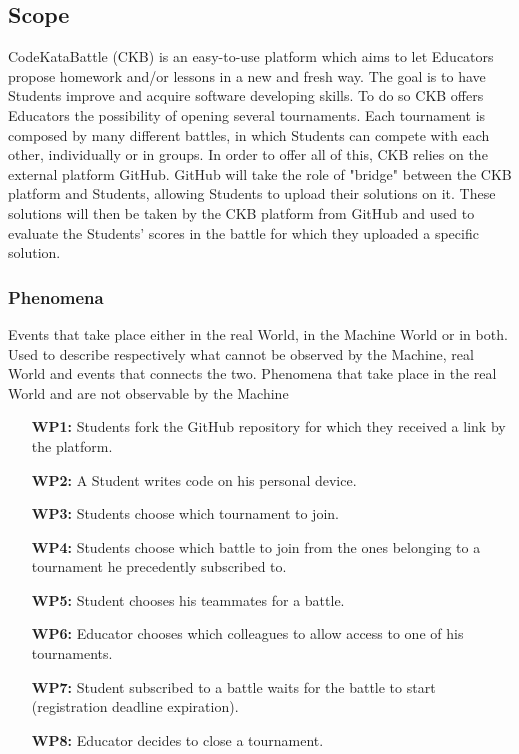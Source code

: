 \documentclass{article}
\newcounter{subsubsubsection}[subsubsection]
\begin{document}
\subsection{Scope}
CodeKataBattle (CKB) is an easy-to-use platform which aims to let Educators propose homework and/or lessons in a new and fresh way. 
The goal is to have Students improve and acquire software developing skills. To do so CKB offers Educators the possibility of opening 
several tournaments. Each tournament is composed by many different battles, in which Students can compete with each other, individually or in groups.
In order to offer all of this, CKB relies on the external platform GitHub. GitHub will take the role of "bridge" between the CKB platform and Students, 
allowing Students to upload their solutions on it. These solutions will then be taken by the CKB platform from GitHub and used to evaluate the Students' scores 
in the battle for which they uploaded a specific solution.
\subsubsection{Phenomena}
Events that take place either in the real World, in the Machine World or in both. Used to describe respectively what cannot be observed by the Machine, real 
World and events that connects the two.
Phenomena that take place in the real World and are not observable by the Machine
\begin{enumerate}
    \item[\textbf{WP1:}] Students fork the GitHub repository for which they received a link by the platform.
    \item[\textbf{WP2:}] A Student writes code on his personal device.
    \item[\textbf{WP3:}] Students choose which tournament to join.
    \item[\textbf{WP4:}] Students choose which battle to join from the ones belonging to a tournament he precedently subscribed to.
    \item[\textbf{WP5:}] Student chooses his teammates for a battle.
    \item[\textbf{WP6:}] Educator chooses which colleagues to allow access to one of his tournaments.
    \item[\textbf{WP7:}] Student subscribed to a battle waits for the battle to start (registration deadline expiration).
    \item[\textbf{WP8:}] Educator decides to close a tournament.
\end{enumerate}
\end{document}
